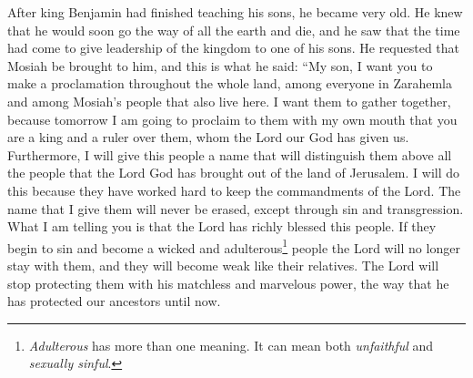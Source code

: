 After king Benjamin had finished teaching his sons, he became very old. He knew that he would soon go the way of all the earth and die, and he saw that the time had come to give leadership of the kingdom to one of his sons.
\bverse \iffalse Therefore, he had Mosiah brought before him; and these are the words which he spake unto him, saying: My son, I would that ye should make a proclamation throughout all this land among all this people, or the people of Zarahemla, and the people of Mosiah who dwell in the land, that thereby they may be gathered together; for on the morrow I shall proclaim unto this my people out of mine own mouth that thou art a king and a ruler over this people, whom the Lord our God hath given us. \fi
He requested that Mosiah be brought to him, and this is what he said: ``My son, I want you to make a proclamation throughout the whole land, among everyone in Zarahemla and among Mosiah's people that also live here. I want them to gather together, because tomorrow I am going to proclaim to them with my own mouth that you are a king and a ruler over them, whom the Lord our God has given us.
\bverse \iffalse And moreover, I will give this people a name, that thereby they may be distinguished above all the people which the Lord God hath brought out of the land of Jerusalem; and this I do because they have been a diligent people in keeping the commandments of the Lord. \fi
Furthermore, I will give this people a name that will distinguish them above all the people that the Lord God has brought out of the land of Jerusalem. I will do this because they have worked hard to keep the commandments of the Lord.
\bverse \iffalse And I give unto them a name that never shall be blotted out, except it be through transgression. \fi
The name that I give them will never be erased, except through sin and transgression.
\bverse \iffalse Yea, and moreover I say unto you, that if this highly favored people of the Lord should fall into transgression, and become a wicked and an adulterous people, that the Lord will deliver them up, that thereby they become weak like unto their brethren; and he will no more preserve them by his matchless and marvelous power, as he has hitherto preserved our fathers. \fi
What I am telling you is that the Lord has richly blessed this people. If they begin to sin and become a wicked and adulterous\footnote{\textit{Adulterous} has more than one meaning. It can mean both \textit{unfaithful} and \textit{sexually sinful}.} people the Lord will no longer stay with them, and they will become weak like their relatives. The Lord will stop protecting them with his matchless and marvelous power, the way that he has protected our ancestors until now.
